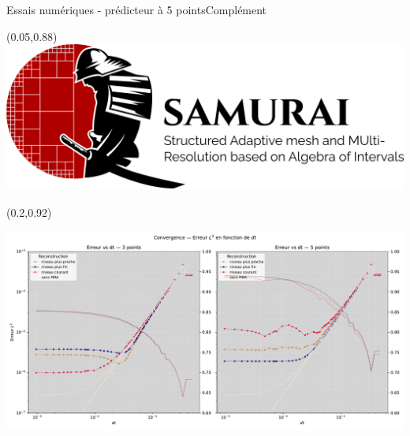 \begin{frame}{Essais numériques - prédicteur à 5 points}{Complément}
    \begin{textblock*}{40pt}(0.05\paperwidth,0.88\paperheight)\includegraphics[scale=.03]{medias/2_/1_/light_logo.png}
    \end{textblock*}
    \begin{textblock*}{40pt}(0.2\paperwidth,0.92\paperheight)
        {\color{black}{+ Ponio}}
    \end{textblock*}
    \includegraphics[width = \textwidth]{medias/3_/error_vs_dt_by_mlf.pdf}
\end{frame}